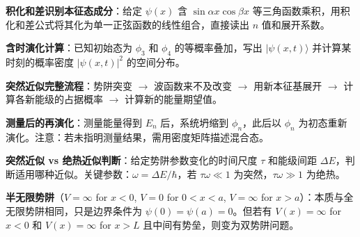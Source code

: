 \begin{drillbox}[训练点与考法变体]
 \textbf{积化和差识别本征态成分}：给定 $\psi(x)$ 含 $\sin\alpha x\cos\beta x$ 等三角函数乘积，用积化和差公式将其化为单一正弦函数的线性组合，直接读出 $n$ 值和展开系数。

 \textbf{含时演化计算}：已知初始态为 $\phi_3$ 和 $\phi_4$ 的等概率叠加，写出 $|\psi(x,t)\rangle$ 并计算某时刻的概率密度 $|\psi(x,t)|^2$ 的空间分布。

 \textbf{突然近似完整流程}：势阱突变 $\to$ 波函数来不及改变 $\to$ 用新本征基展开 $\to$ 计算各新能级的占据概率 $\to$ 计算新的能量期望值。

 \textbf{测量后的再演化}：测量能量得到 $E_n$ 后，系统坍缩到 $\phi_n$，此后以 $\phi_n$ 为初态重新演化。注意：若未指明测量结果，需用密度矩阵描述混合态。

 \textbf{突然近似 vs 绝热近似判断}：给定势阱参数变化的时间尺度 $\tau$ 和能级间距 $\Delta E$，判断适用哪种近似。关键参数：$\omega=\Delta E/\hbar$，若 $\tau\omega\ll1$ 为突然，$\tau\omega\gg1$ 为绝热。

 \textbf{半无限势阱}（$V=\infty$ for $x<0$, $V=0$ for $0<x<a$, $V=\infty$ for $x>a$）：本质与全无限势阱相同，只是边界条件为 $\psi(0)=\psi(a)=0$。但若有 $V(x)=\infty$ for $x<0$ 和 $V(x)=\infty$ for $x>L$ 且中间有势垒，则变为双势阱问题。
\end{drillbox}

